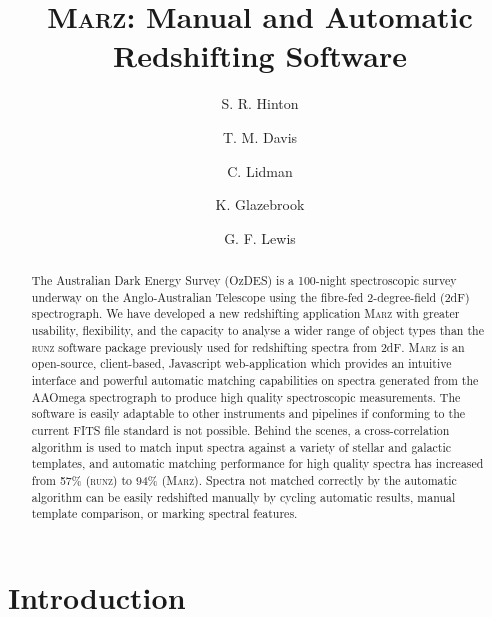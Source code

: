 \documentclass[iop]{emulateapj}
\newcommand{\runz}{\textsc{runz}}
\newcommand{\marz}{\textsc{Marz}}
\begin{document}
\title{\marz{}: Manual and Automatic Redshifting Software}

\author{S. R. Hinton}
\author{T. M. Davis}
\author{C. Lidman}
\author{K. Glazebrook}
\author{G. F. Lewis}

\begin{abstract}
The Australian Dark Energy Survey (OzDES) is a 100-night spectroscopic survey underway on the Anglo-Australian Telescope using the fibre-fed 2-degree-field (2dF) spectrograph.  We have developed a new redshifting application \marz{} with greater usability, flexibility, and the capacity to analyse a wider range of object types than the \runz{} software package previously used for redshifting spectra from 2dF. \marz{} is an open-source, client-based, Javascript web-application which provides an intuitive interface and powerful automatic matching capabilities on spectra generated from the AAOmega spectrograph to produce high quality spectroscopic measurements. The software is easily adaptable to other instruments and pipelines if conforming to the current FITS file standard is not possible. Behind the scenes, a cross-correlation algorithm is used to match input spectra against a variety of stellar and galactic templates, and automatic matching performance for high quality spectra has increased from 57\% (\runz{}) to 94\% (\marz{}). Spectra not matched correctly by the automatic algorithm can be easily redshifted manually by cycling automatic results, manual template comparison, or marking spectral features.
\end{abstract}

\section{Introduction}
\end{document}
